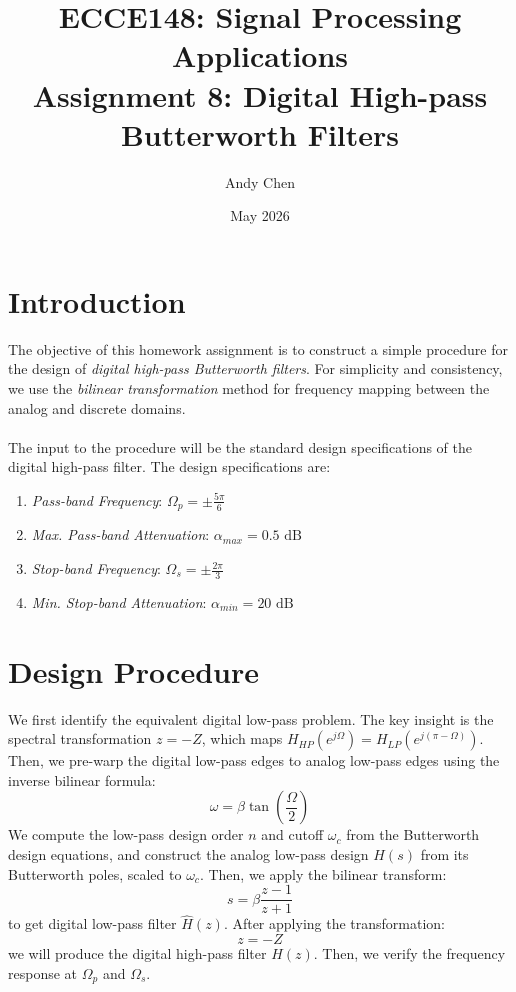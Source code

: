 \documentclass{article}
\title{ECCE148: Signal Processing Applications \\ \large
        Assignment 8: Digital High-pass Butterworth Filters}
\author{Andy Chen}
\date{May 2026}
\begin{document}
\maketitle

\section{Introduction}
The objective of this homework assignment is to construct a simple procedure for the design of \textit{digital high-pass Butterworth filters}. For simplicity and consistency, we use the \textit{bilinear transformation} method for frequency mapping between the analog and discrete domains.
\\
\\
The input to the procedure will be the standard design specifications of the digital high-pass filter. The design specifications are:
\begin{enumerate}[label=\alph*.,leftmargin=2cm, rightmargin=2cm]
    \item \textit{Pass-band Frequency}: \hfill \(\Omega_p=\pm\frac{5\pi}{6}\)
    \item \textit{Max. Pass-band Attenuation}: \hfill \(\alpha_{max}=0.5\text{ dB}\)
    \item \textit{Stop-band Frequency}: \hfill \(\Omega_s=\pm\frac{2\pi}{3}\)
    \item \textit{Min. Stop-band Attenuation}: \hfill \(\alpha_{min}=20\text{ dB}\)
\end{enumerate}

\section{Design Procedure}
We first identify the equivalent digital low-pass problem. The key insight is the spectral transformation \(z=-Z\), which maps \(H_{HP}(e^{j\Omega}) = H_{LP}(e^{j(\pi-\Omega)})\). Then, we pre-warp the digital low-pass edges to analog low-pass edges using the inverse bilinear formula: 
\[\omega=\beta\tan(\frac{\Omega}{2})\]
We compute the low-pass design order \(n\) and cutoff \(\omega_c\) from the Butterworth design equations, and construct the analog low-pass design \(H(s)\) from its Butterworth poles, scaled to \(\omega_c\). Then, we apply the bilinear transform:
\[
s=\beta\frac{z-1}{z+1}
\]
to get digital low-pass filter \(\hat{H}(z)\). After applying the transformation:
\[
z=-Z
\]
we will produce the digital high-pass filter \(H(z)\). Then, we verify the frequency response at \(\Omega_p\) and \(\Omega_s\).
\end{document}
